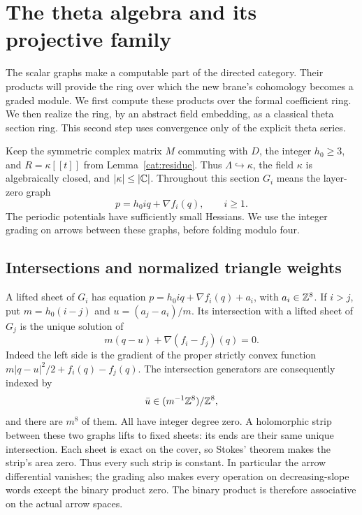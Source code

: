 \section{The theta algebra and its projective family}\label{theta:section}

The scalar graphs make a computable part of the directed category.  Their
products will provide the ring over which the new brane's cohomology becomes
a graded module.  We first compute these products over the formal coefficient
ring.  We then realize the ring, by an abstract field embedding, as a classical
theta section ring.  This second step uses convergence only of the explicit
theta series.

Keep the symmetric complex matrix $M$ commuting with $D$, the integer
$h_0\geq3$, and $R=\kappa[[t]]$ from Lemma~\ref{cat:residue}.  Thus
$\Lambda\hookrightarrow\kappa$, the field $\kappa$ is algebraically closed,
and $|\kappa|\leq|\mathbb C|$.  Throughout this section $G_i$ means the layer-zero
graph
\[
 p=h_0i q+\nabla f_i(q),\qquad i\geq1.
\]
The periodic potentials have sufficiently small Hessians.  We use the
integer grading on arrows between these graphs, before folding modulo four.

\subsection{Intersections and normalized triangle weights}

A lifted sheet of $G_i$ has equation
$p=h_0i q+\nabla f_i(q)+a_i$, with $a_i\in\mathbb Z^8$.  If $i>j$, put
$m=h_0(i-j)$ and $u=(a_j-a_i)/m$.  Its intersection with a lifted sheet of
$G_j$ is the unique solution of
\begin{equation}\label{theta:intersection}
 m(q-u)+\nabla(f_i-f_j)(q)=0.
\end{equation}
Indeed the left side is the gradient of the proper strictly convex function
$m|q-u|^2/2+f_i(q)-f_j(q)$.  The intersection generators are consequently
indexed by
\[
 \bar u\in (m^{-1}\mathbb Z^8)/\mathbb Z^8,
\]
and there are $m^8$ of them.  All have integer degree zero.  A holomorphic
strip between these two graphs lifts to fixed sheets: its ends are their
same unique intersection.  Each sheet is exact on the cover, so Stokes'
theorem makes the strip's area zero.  Thus every such strip is constant.
In particular the arrow differential vanishes; the grading also makes
every operation on decreasing-slope words except the binary product zero.
The binary product is therefore associative on the actual arrow spaces.

